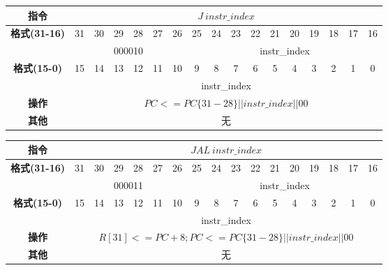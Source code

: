 \documentclass[11pt,utf8]{article}
\begin{document}
\begin{center}
\begin{tabular}{|c|c|c|c|c|c|c|c|c|c|c|c|c|c|c|c|c|}
\hline
\textbf{指令} & \multicolumn{16}{c|}{$J~instr\_index$} \\
\hline
\multirow{2}{*}{\textbf{格式(31-16)}} & 31 & 30 & 29 & 28 & 27 & 26 & 25 & 24 & 23 & 22 & 21 & 20 & 19 & 18 & 17 & 16 \\ 
\cline{2-17}
& \multicolumn{6}{c|}{000010} & \multicolumn{10}{c|}{instr\_index}\\
\hline
\multirow{2}{*}{\textbf{格式(15-0)}} & 15 & 14 & 13 & 12 & 11 & 10 & 9 & 8 & 7 & 6 & 5 & 4 & 3 & 2 & 1 & 0 \\
\cline{2-17}
& \multicolumn{16}{c|}{instr\_index}\\
\hline
\textbf{操作} & \multicolumn{16}{c|}{$PC <= PC\{31-28\}||instr\_index || 00$} \\
\hline
\textbf{其他} & \multicolumn{16}{c|}{无} \\
\hline
\end{tabular}
\end{center}

\begin{center}
\begin{tabular}{|c|c|c|c|c|c|c|c|c|c|c|c|c|c|c|c|c|}
\hline
\textbf{指令} & \multicolumn{16}{c|}{$JAL~instr\_index$} \\
\hline
\multirow{2}{*}{\textbf{格式(31-16)}} & 31 & 30 & 29 & 28 & 27 & 26 & 25 & 24 & 23 & 22 & 21 & 20 & 19 & 18 & 17 & 16 \\ 
\cline{2-17}
& \multicolumn{6}{c|}{000011} & \multicolumn{10}{c|}{instr\_index}\\
\hline
\multirow{2}{*}{\textbf{格式(15-0)}} & 15 & 14 & 13 & 12 & 11 & 10 & 9 & 8 & 7 & 6 & 5 & 4 & 3 & 2 & 1 & 0 \\
\cline{2-17}
& \multicolumn{16}{c|}{instr\_index}\\
\hline
\textbf{操作} & \multicolumn{16}{c|}{$R[31]<=PC+8;PC<=PC\{31-28\}||instr\_index||00$} \\
\hline
\textbf{其他} & \multicolumn{16}{c|}{无} \\
\hline
\end{tabular}
\end{center}
\end{document}
